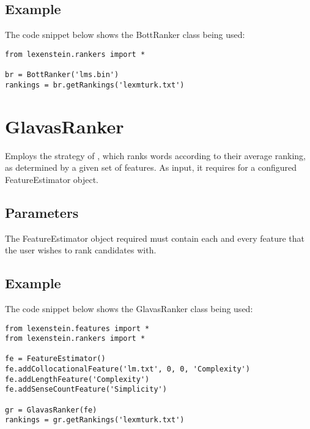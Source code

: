 \subsection{Example}

The code snippet below shows the BottRanker class being used:

\begin{lstlisting}
from lexenstein.rankers import *

br = BottRanker('lms.bin')
rankings = br.getRankings('lexmturk.txt')
\end{lstlisting}











\section{GlavasRanker}

Employs the strategy of \cite{glavas2015}, which ranks words according to their average ranking, as determined by a given set of features. As input, it requires for a configured FeatureEstimator object.

\subsection{Parameters}

The FeatureEstimator object required must contain each and every feature that the user wishes to rank candidates with.

\subsection{Example}

The code snippet below shows the GlavasRanker class being used:

\begin{lstlisting}
from lexenstein.features import *
from lexenstein.rankers import *

fe = FeatureEstimator()
fe.addCollocationalFeature('lm.txt', 0, 0, 'Complexity')
fe.addLengthFeature('Complexity')
fe.addSenseCountFeature('Simplicity')

gr = GlavasRanker(fe)
rankings = gr.getRankings('lexmturk.txt')
\end{lstlisting}